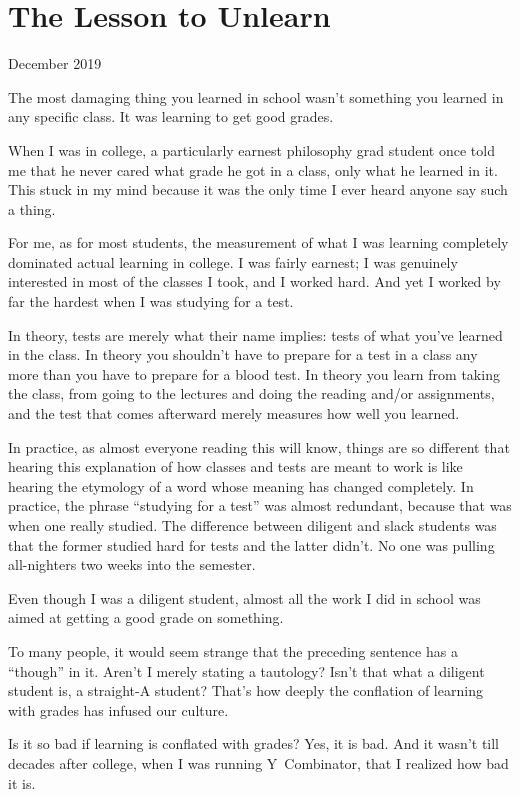 \chapter{The Lesson to Unlearn}

December 2019

The most damaging thing you learned in school wasn't something you
learned in any specific class. It was learning to get good grades.

When I was in college, a particularly earnest philosophy grad student
once told me that he never cared what grade he got in a class, only what
he learned in it. This stuck in my mind because it was the only time I
ever heard anyone say such a thing.

For me, as for most students, the measurement of what I was learning
completely dominated actual learning in college. I was fairly earnest; I
was genuinely interested in most of the classes I took, and I worked
hard. And yet I worked by far the hardest when I was studying for a
test.

In theory, tests are merely what their name implies: tests of what
you've learned in the class. In theory you shouldn't have to prepare for
a test in a class any more than you have to prepare for a blood test. In
theory you learn from taking the class, from going to the lectures and
doing the reading and/or assignments, and the test that comes afterward
merely measures how well you learned.

In practice, as almost everyone reading this will know, things are so
different that hearing this explanation of how classes and tests are
meant to work is like hearing the etymology of a word whose meaning has
changed completely. In practice, the phrase ``studying for a test'' was
almost redundant, because that was when one really studied. The
difference between diligent and slack students was that the former
studied hard for tests and the latter didn't. No one was pulling
all-nighters two weeks into the semester.

Even though I was a diligent student, almost all the work I did in
school was aimed at getting a good grade on something.

To many people, it would seem strange that the preceding sentence has a
``though'' in it. Aren't I merely stating a tautology? Isn't that what a
diligent student is, a straight-A student? That's how deeply the
conflation of learning with grades has infused our culture.

Is it so bad if learning is conflated with grades? Yes, it is bad. And
it wasn't till decades after college, when I was running Y~Combinator,
that I realized how bad it is.

